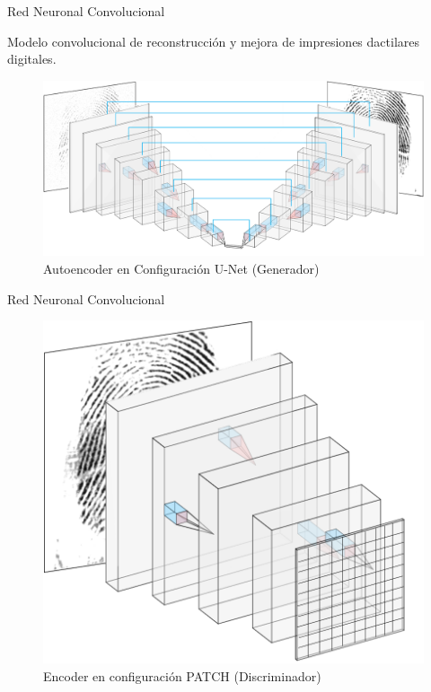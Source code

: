 \documentclass[12pt]{beamer}
\begin{document}
\begin{frame}{Red Neuronal Convolucional}

    Modelo convolucional de reconstrucción y mejora de impresiones dactilares digitales.

    \begin{figure}[h]
        \includegraphics[scale=0.42]{figs/layers_nn_u.PNG}
        \caption{Autoencoder en Configuración U-Net (Generador)}
    \end{figure}

\end{frame}


\begin{frame}{Red Neuronal Convolucional}

    \begin{figure}[h]
        \includegraphics[scale=0.4]{figs/disc_cuad.png}
        \caption{Encoder en configuración PATCH (Discriminador)}
    \end{figure}

\end{frame}
\end{document}
